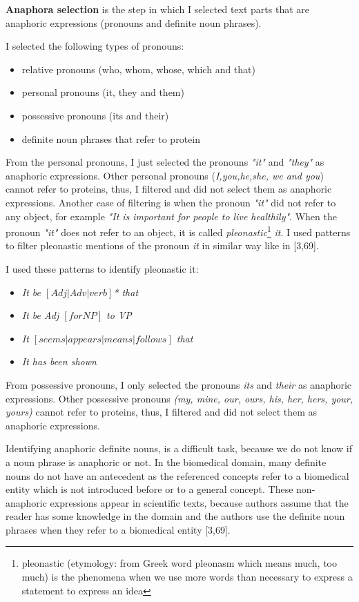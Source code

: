 \textbf{Anaphora selection} is the step in which I selected text parts that are anaphoric expressions (pronouns and definite noun phrases).
 
I selected the following types of pronouns:

\begin{itemize}
	\item relative pronouns (who, whom, whose, which and that)
	\item personal pronouns (it, they and them)
	\item possessive pronouns (its and their)
	\item definite noun phrases that refer to protein 
\end{itemize}

From the personal pronouns, I just selected the pronouns \emph{"it"} and \emph{"they"} as anaphoric expressions. Other personal pronouns (\emph{I,you,he,she, we and you}) cannot refer to proteins, thus, I filtered and did not select them as anaphoric expressions. Another case of filtering is when the pronoun \emph{"it"} did not refer to any object, for example \emph{"It is important for people to live healthily"}. When the pronoun \emph{"it"} does not refer to an object, it is called \emph{pleonastic}\footnote{ pleonastic (etymology: from Greek word pleonasm which means much, too much) is the phenomena when we use more words than necessary to express a statement to express an idea} \emph{it}. I used patterns to filter pleonastic mentions of the pronoun \emph{it} in similar way like in [3,69]. 

I used these patterns to identify pleonastic it:

\begin{itemize}
	\item \emph{It be $[Adj | Adv | verb]$* that}
	\item \emph{It be Adj $[for NP]$ to VP}
	\item \emph{It $[seems | appears | means | follows]$ that} 
	\item \emph{It has been shown}
\end{itemize}

From possessive pronouns, I only selected the pronouns \emph{its} and \emph{their} as anaphoric expressions. Other possessive pronouns \emph{(my, mine, our, ours, his, her, hers, your, yours)} cannot refer to proteins, thus, I filtered and did not select them as anaphoric expressions.

Identifying anaphoric definite nouns, is a difficult task, because we do not know if a noun phrase is anaphoric or not. In the biomedical domain, many definite nouns do not have an antecedent as the referenced concepts refer to a biomedical entity which is not introduced before or to a general concept. These non-anaphoric expressions appear in scientific texts, because authors assume that the reader has some knowledge in the domain and the authors use the definite noun phrases when they refer to a biomedical entity [3,69]. 

